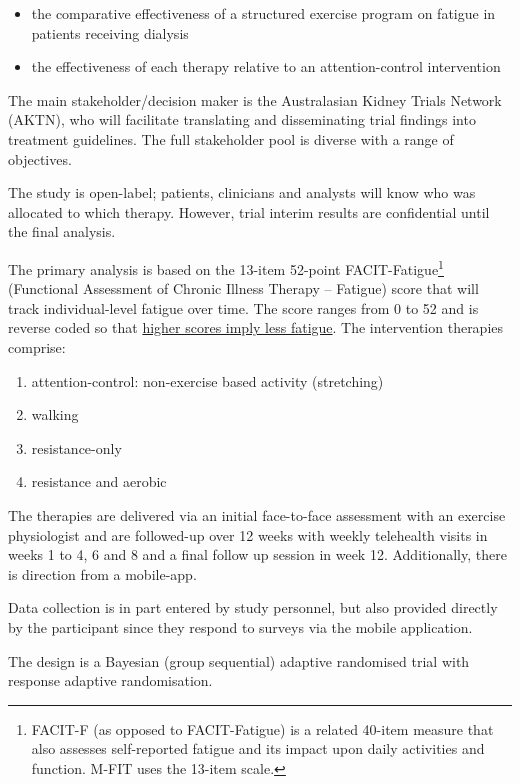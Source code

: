 \documentclass[
]{article}
\providecommand{\tightlist}{%
  \setlength{\itemsep}{0pt}\setlength{\parskip}{0pt}}
\begin{document}
\begin{itemize}\tightlist
  \item the comparative effectiveness of a structured exercise program on fatigue in patients receiving dialysis
  \item the effectiveness of each therapy relative to an attention-control intervention
\end{itemize}

The main stakeholder/decision maker is the Australasian Kidney Trials Network (AKTN), who will facilitate translating and disseminating trial findings into treatment guidelines.
The full stakeholder pool is diverse with a range of objectives.

The study is open-label; patients, clinicians and analysts will know who was allocated to which therapy.
However, trial interim results are confidential until the final analysis.

The primary analysis is based on the 13-item 52-point FACIT-Fatigue\footnote{FACIT-F (as opposed to FACIT-Fatigue) is a related 40-item measure that also assesses self-reported fatigue and its impact upon daily activities and function. M-FIT uses the 13-item scale.} (Functional Assessment of Chronic Illness Therapy – Fatigue) score that will track individual-level fatigue over time.
The score ranges from 0 to 52 and is reverse coded so that \underline{higher scores imply less fatigue}.
The intervention therapies comprise:

\begin{enumerate}\tightlist
  \item attention-control: non-exercise based activity (stretching)
  \item walking
  \item resistance-only
  \item resistance and aerobic
\end{enumerate}

The therapies are delivered via an initial face-to-face assessment with an exercise physiologist and are followed-up over 12 weeks with weekly telehealth visits in weeks 1 to 4, 6 and 8 and a final follow up session in week 12.
Additionally, there is direction from a mobile-app.

Data collection is in part entered by study personnel, but also provided directly by the participant since they respond to surveys via the mobile application.

The design is a Bayesian (group sequential) adaptive randomised trial with response adaptive randomisation.
\end{document}

